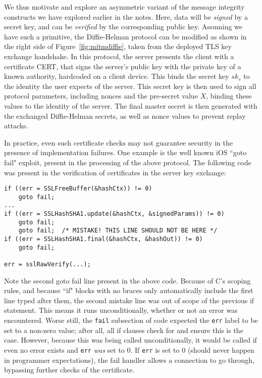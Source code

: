 We thus motivate and explore an asymmetric variant of the message integrity constructs we have explored earlier in the notes.  Here, data will be \emph{signed} by a secret key, and can be \emph{verified} by the corresponding public key.  Assuming we have such a primitive, the Diffie-Helman protocol can be modified as shown in the right side of Figure~\ref{fig:mitmdiffie}, taken from the deployed TLS key exchange handshake.  In this protocol, the server presents the client with a certificate CERT, that signs the server's public key with the private key of a known authority, hardcoded on a client device.  This binds the secret key $sk_s$ to the identity the user expects of the server.  This secret key is then used to sign all protocol parameters, including nonces and the pre-secret value $X$, binding these values to the identity of the server.  The final master secret is then generated with the exchanged Diffie-Helman secrets, as well as nonce values to prevent replay attacks.

In practice, even such certificate checks may not guarantee security in the presence of implementation failures.  One example is the well known iOS ``goto fail" exploit, present in the processing of the above protocol.  The following code was present in the verification of certificates in the server key exchange:

\begin{verbatim}
if ((err = SSLFreeBuffer(&hashCtx)) != 0)
    goto fail;
...
if ((err = SSLHashSHA1.update(&hashCtx, &signedParams)) != 0)
    goto fail;
    goto fail;  /* MISTAKE! THIS LINE SHOULD NOT BE HERE */
if ((err = SSLHashSHA1.final(&hashCtx, &hashOut)) != 0)
    goto fail;

err = sslRawVerify(...);
\end{verbatim}

Note the second goto fail line present in the above code.  Because of C's scoping rules, and because ``if" blocks with no braces only automatically include the first line typed after them, the second mistake line was out of scope of the previous if statement.  This means it runs unconditionally, whether or not an error was encountered.  Worse still, the \texttt{fail} subsection of code expected the \texttt{err} label to be set to a non-zero value; after all, all if clauses check for and ensure this is the case.  However, because this was being called unconditionally, it would be called if even no error exists and \texttt{err} \emph{was} set to 0.  If \texttt{err} is set to 0 (should never happen in programmer expectations), the fail handler allows a connection to go through, bypassing further checks of the certificate.

